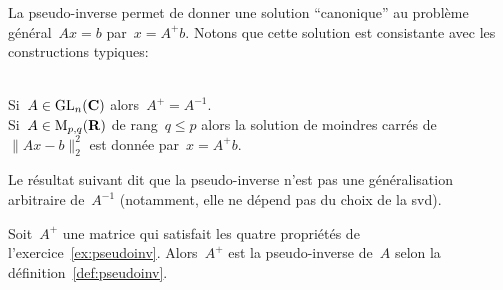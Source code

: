 La pseudo-inverse permet de donner une solution ``canonique'' au problème
général~$Ax=b$ par~$x=A^+b$.  Notons que cette solution est consistante avec
les constructions typiques:

\begin{exercice}$ $\\
	Si~$A\in\mathrm{GL}_n(\mathbf{C})$ alors~$A^+=A^{-1}$.\\
	Si~$A\in\mathrm{M}_{p,q}(\mathbf{R})$ de rang~$q\le p$ alors la solution de moindres carrés
	de~$\|Ax-b\|^2_2$ est donnée par~$x=A^+b$.
\end{exercice}

Le résultat suivant dit que la pseudo-inverse n'est pas une généralisation
arbitraire de~$A^{-1}$ (notamment, elle ne dépend pas du choix de la svd).

\begin{theorem}[Penrose 1955]
	Soit~$A^+$ une matrice qui satisfait les quatre propriétés de
	l'exercice~\ref{ex:pseudoinv}.  Alors~$A^+$ est la pseudo-inverse de~$A$
	selon la définition~\ref{def:pseudoinv}.
\end{theorem}

